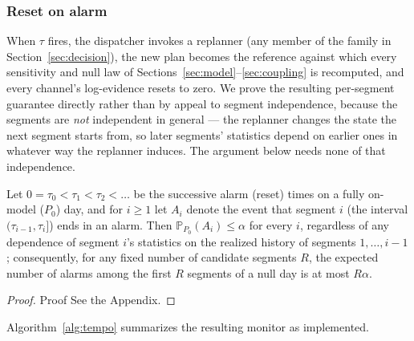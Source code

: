 \documentclass[trsc,dblanonrev]{informs4}
\newcommand{\Prob}{\mathbb{P}}
\begin{document}
\subsubsection{Reset on alarm}

When $\tau$ fires, the dispatcher invokes a replanner (any member of
the family in Section~\ref{sec:decision}), the new plan becomes the
reference against which every sensitivity and null law of
Sections~\ref{sec:model}--\ref{sec:coupling} is recomputed, and every
channel's log-evidence resets to zero. We prove the resulting
per-segment guarantee directly rather than by appeal to segment
independence, because the segments are \emph{not} independent in
general --- the replanner changes the state the next segment starts
from, so later segments' statistics depend on earlier ones in whatever
way the replanner induces. The argument below needs none of that
independence.

\begin{proposition}\label{prop:segments}
Let $0 = \tau_0 < \tau_1 < \tau_2 < \dots$ be the successive alarm
(reset) times on a fully on-model ($P_0$) day, and for $i \ge 1$ let
$A_i$ denote the event that segment $i$ (the interval $(\tau_{i-1},
\tau_i]$) ends in an alarm. Then $\Prob_{P_0}(A_i) \le \alpha$ for
every $i$, regardless of any dependence of segment $i$'s statistics on
the realized history of segments $1, \dots, i-1$; consequently, for any
fixed number of candidate segments $R$, the expected number of alarms
among the first $R$ segments of a null day is at most $R\alpha$.
\end{proposition}

\begin{proof}{Proof}
See the Appendix.
\end{proof}



Algorithm~\ref{alg:tempo} summarizes the resulting monitor as
implemented.
\end{document}
